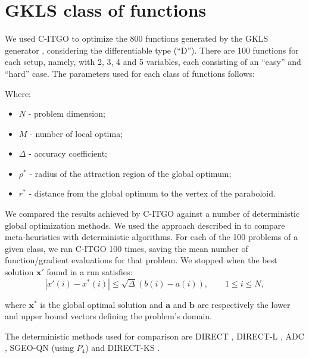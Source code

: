 
\section*{GKLS class of functions}

We used C-ITGO to optimize the 800 functions generated by the GKLS generator \citep{GKLS}, considering the differentiable type (“D”). There are 100 functions for each setup, namely, with 2, 3, 4 and 5 variables, each consisting of an “easy” and “hard” case. The parameters used for each class of functions follows:





\noindent
Where:


\begin{itemize}

\item $N$ - problem dimension;
\item $M$ - number of local optima;
\item $\Delta$ - accuracy coefficient;
\item $\rho^*$ - radius of the attraction region of the global optimum;
\item $r^*$ - distance from the global optimum to the vertex of the paraboloid.

\end{itemize}


We compared the results achieved by C-ITGO against a number of deterministic global optimization methods. We used the approach described in \cite{NAT} to compare meta-heuristics with deterministic algorithms. For each of the 100 problems of a given class, we ran C-ITGO 100 times, saving the mean number of function/gradient evaluations for that problem. We stopped when the best solution $\bm{x}'$ found in a run satisfies:\\[-2.5em]

\begin{equation}\label{eq:Convergence}
    |x'(i) - x^*(i)| \leq \sqrt{\Delta}(b(i) - a(i)), \qquad 1 \leq i \leq N,
\end{equation}


\noindent
where $\bm{x}^*$ is the global optimal solution and $\bm{a}$ and $\bm{b}$ are respectively the lower and upper bound vectors defining the problem's domain.

The deterministic methods used for comparison are DIRECT \citep{DIRECT}, DIRECT-L \citep{DIRECTL}, ADC \citep{ADC}, SGEO-QN \citep{SGEO} (using $P_4$) and DIRECT-KS \citep{ADC2}. 

